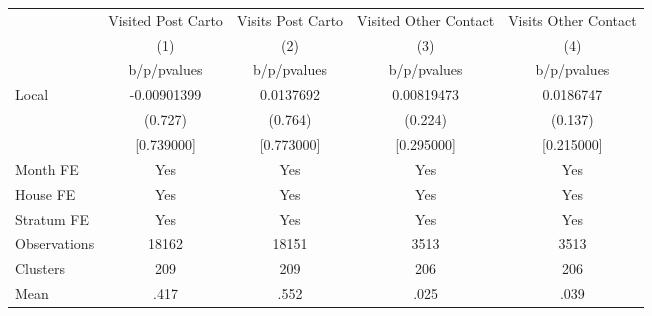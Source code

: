 {
\def\sym#1{\ifmmode^{#1}\else\(^{#1}\)\fi}
\begin{tabular}{l*{4}{c}}
\toprule
                &\multicolumn{1}{c}{Visited Post Carto}&\multicolumn{1}{c}{Visits Post Carto}&\multicolumn{1}{c}{Visited Other Contact}&\multicolumn{1}{c}{Visits Other Contact}\\
                &\multicolumn{1}{c}{(1)}&\multicolumn{1}{c}{(2)}&\multicolumn{1}{c}{(3)}&\multicolumn{1}{c}{(4)}\\
                &b/p/pvalues&b/p/pvalues&b/p/pvalues&b/p/pvalues\\
\midrule
Local           &-0.00901399&0.0137692&0.00819473&0.0186747\\
                &  (0.727)&  (0.764)&  (0.224)&  (0.137)\\
                &[0.739000]&[0.773000]&[0.295000]&[0.215000]\\
Month FE        &      Yes&      Yes&      Yes&      Yes\\
House FE        &      Yes&      Yes&      Yes&      Yes\\
Stratum FE      &      Yes&      Yes&      Yes&      Yes\\
\midrule
Observations    &    18162&    18151&     3513&     3513\\
Clusters        &      209&      209&      206&      206\\
Mean            &     .417&     .552&     .025&     .039\\
\bottomrule
\end{tabular}
}
